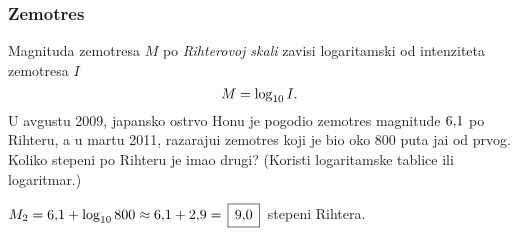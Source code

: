 \subsubsection{Zem{\lj}otres}

\zadatak Magnituda zem{\lj}otresa $M$ po {\sl Rihterovoj skali} zavisi logaritamski od 
inten\-zi\-te\-ta zem{\lj}otresa $I$ 
$$
M=\logten I.
$$
U avgustu 2009, japansko ostrvo Hon{\sv}u 
je pogodio zem{\lj}otres magnitude $6\.1$ po Rihteru, a u martu 2011,
razaraju{\cc}i zem{\lj}otres koji je bio oko 800 puta ja{\cv}i od prvog. Koliko stepeni po Rihteru je imao drugi?
(Koristi logaritamske tablice ili logaritmar.)

\resenje $M_2 = 6\.1 + \logten 800\approx 6\.1 + 2\.9 = \ram{9\.0}$ stepeni Rihtera. 
